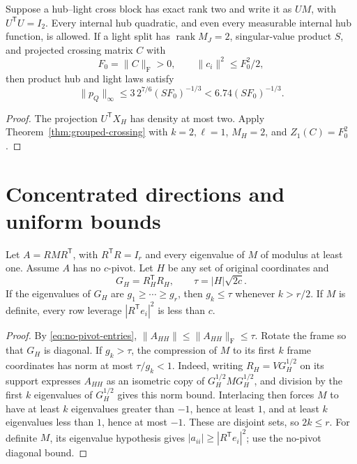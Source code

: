 \begin{corollary}
\label{cor:many-two-hubs}
Suppose a hub--light cross block has exact rank two and
write it as \(UM\), with \(U^{\mathsf T}U=I_2\).
Every internal hub quadratic, and even every measurable
internal hub function, is allowed.
If a light split has \(\operatorname{rank}M_J=2\),
singular-value product \(S\), and projected crossing
matrix \(C\) with
\[
 F_0=\|C\|_{\mathrm F}>0,\qquad
 \|c_i\|^2\leq F_0^2/2,
\]
then product hub and light laws satisfy
\[
 \|p_Q\|_\infty
 \leq3\,2^{7/6}(SF_0)^{-1/3}<6.74(SF_0)^{-1/3}.
\]
\end{corollary}
\begin{proof}
The projection \(U^{\mathsf T}X_H\) has density at most
two.  Apply Theorem~\ref{thm:grouped-crossing} with
\(k=2,\ell=1\), \(M_H=2\), and \(Z_1(C)=F_0^2\).
\end{proof}

\section{Concentrated directions and uniform bounds}
\label{sec:structural-boundaries}

\begin{lemma}
\label{lem:heavy-isotropic}
Let \(A=RMR^{\mathsf T}\), with \(R^{\mathsf T}R=I_r\)
and every eigenvalue of \(M\) of modulus at least one.
Assume \(A\) has no \(c\)-pivot.  Let \(H\) be any set of
original coordinates and
\[
 G_H=R_H^{\mathsf T}R_H,\qquad
 \tau=|H|\sqrt{2c}.
\]
If the eigenvalues of \(G_H\) are \(g_1\geq\cdots\geq g_r\),
then \(g_k\leq\tau\) whenever \(k>r/2\).
If \(M\) is definite, every row leverage
\(|R^{\mathsf T}e_i|^2\) is less than \(c\).
\end{lemma}
\begin{proof}
By \eqref{eq:no-pivot-entries},
\(\|A_{HH}\|\leq\|A_{HH}\|_{\mathrm F}\leq\tau\).
Rotate the frame so that \(G_H\) is diagonal.
If \(g_k>\tau\), the compression of \(M\) to its first
\(k\) frame coordinates has norm at most \(\tau/g_k<1\).
Indeed, writing \(R_H=VG_H^{1/2}\) on its support
expresses \(A_{HH}\) as an isometric copy of
\(G_H^{1/2}MG_H^{1/2}\), and division by the first
\(k\) eigenvalues of \(G_H^{1/2}\) gives this norm bound.
Interlacing then forces \(M\) to have at least \(k\)
eigenvalues greater than \(-1\), hence at least \(1\),
and at least \(k\) eigenvalues less than \(1\), hence at
most \(-1\).  These are disjoint sets, so \(2k\leq r\).
For definite \(M\), its eigenvalue hypothesis gives
\(|a_{ii}|\geq|R^{\mathsf T}e_i|^2\); use the
no-pivot diagonal bound.
\end{proof}

